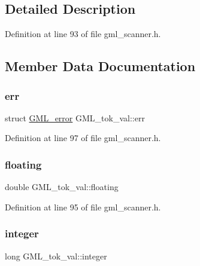 \subsection{Detailed Description}


Definition at line 93 of file gml\+\_\+scanner.\+h.



\subsection{Member Data Documentation}
\mbox{\label{union_g_m_l__tok__val_a4478d63e0be576766318a44868205536}} 
\subsubsection{\texorpdfstring{err}{err}}
{\footnotesize\ttfamily struct \mbox{\hyperlink{struct_g_m_l__error}{G\+M\+L\+\_\+error}} G\+M\+L\+\_\+tok\+\_\+val\+::err}



Definition at line 97 of file gml\+\_\+scanner.\+h.

\mbox{\label{union_g_m_l__tok__val_a3684fb257807d1fe7f5ff0671de750cf}} 
\subsubsection{\texorpdfstring{floating}{floating}}
{\footnotesize\ttfamily double G\+M\+L\+\_\+tok\+\_\+val\+::floating}



Definition at line 95 of file gml\+\_\+scanner.\+h.

\mbox{\label{union_g_m_l__tok__val_af96a245d02f0ac03aa40c34a91c3f656}} 
\subsubsection{\texorpdfstring{integer}{integer}}
{\footnotesize\ttfamily long G\+M\+L\+\_\+tok\+\_\+val\+::integer}



